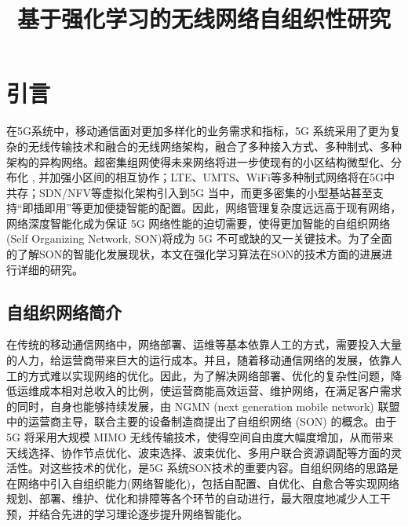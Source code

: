 \documentclass{IEEEtran}
\begin{document}
\title{基于强化学习的无线网络自组织性研究}

\maketitle

%

\section{引言}
在5G系统中，移动通信面对更加多样化的业务需求和指标，5G 系统采用了更为复杂的无线传输技术和融合的无线网络架构，融合了多种接入方式、多种制式、多种架构的异构网络。超密集组网使得未来网络将进一步使现有的小区结构微型化、分布化 , 并加强小区间的相互协作；LTE、UMTS、WiFi等多种制式网络将在5G中共存；SDN/NFV等虚拟化架构引入到5G 当中，而更多密集的小型基站甚至支持“即插即用”等更加便捷智能的配置。因此，网络管理复杂度远远高于现有网络，网络深度智能化成为保证 5G 网络性能的迫切需要，使得更加智能的自组织网络(Self Organizing Network, SON)将成为 5G 不可或缺的又一关键技术。为了全面的了解SON的智能化发展现状，本文在强化学习算法在SON的技术方面的进展进行详细的研究。

\subsection{自组织网络简介}


在传统的移动通信网络中，网络部署、运维等基本依靠人工的方式，需要投入大量的人力，给运营商带来巨大的运行成本。并且，随着移动通信网络的发展，依靠人工的方式难以实现网络的优化。因此，为了解决网络部署、优化的复杂性问题，降低运维成本相对总收入的比例，使运营商能高效运营、维护网络，在满足客户需求的同时，自身也能够持续发展，由 NGMN (next generation mobile network) 联盟中的运营商主导，联合主要的设备制造商提出了自组织网络 (SON) 的概念\cite{Alliance2008}。由于 5G 将采用大规模 MIMO 无线传输技术，使得空间自由度大幅度增加，从而带来天线选择、协作节点优化、波束选择、波束优化、多用户联合资源调配等方面的灵活性。对这些技术的优化，是5G 系统SON技术的重要内容。自组织网络的思路是在网络中引入自组织能力(网络智能化)，包括自配置、自优化、自愈合等实现网络规划、部署、维护、优化和排障等各个环节的自动进行，最大限度地减少人工干预，并结合先进的学习理论逐步提升网络智能化。
\end{document}
